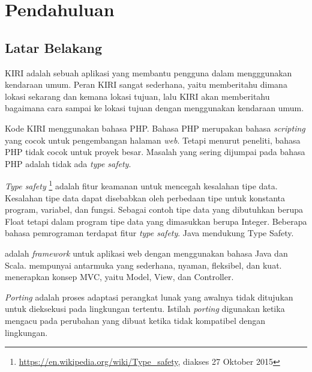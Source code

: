 \chapter{Pendahuluan}
\label{chap:pendahuluan}

\section{Latar Belakang}
\label{sec:latarbelakang}

KIRI \cite{statickiri} adalah sebuah aplikasi yang membantu pengguna dalam mengggunakan kendaraan umum. Peran KIRI sangat sederhana, yaitu memberitahu dimana lokasi sekarang dan kemana lokasi tujuan, lalu KIRI akan memberitahu bagaimana cara sampai ke lokasi tujuan dengan menggunakan kendaraan umum. 

Kode KIRI \cite{githubkiri} menggunakan bahasa PHP. Bahasa PHP \cite{phpnet} merupakan bahasa \textit{scripting} yang cocok untuk pengembangan halaman \textit{web}. Tetapi menurut peneliti, bahasa PHP tidak cocok untuk proyek besar. Masalah yang sering dijumpai pada bahasa PHP adalah tidak ada \textit{type safety}. 

\textit{Type safety} \footnote{ \url{https://en.wikipedia.org/wiki/Type_safety}, diakses 27 Oktober 2015} adalah fitur keamanan untuk mencegah kesalahan tipe data. Kesalahan tipe data dapat disebabkan oleh perbedaan tipe untuk konstanta program, variabel, dan fungsi. Sebagai contoh tipe data yang dibutuhkan berupa Float tetapi dalam program tipe data yang dimasukkan berupa Integer. Beberapa bahasa pemrograman terdapat fitur \textit{type safety}. Java mendukung Type Safety.

\play adalah \textit{framework} untuk aplikasi web dengan menggunakan bahasa Java dan Scala. \play mempunyai antarmuka yang sederhana, nyaman, fleksibel, dan kuat. \play menerapkan konsep MVC, yaitu Model, View, dan Controller\cite{playforjava}. 

\textit{Porting} adalah proses adaptasi perangkat lunak yang awalnya tidak ditujukan untuk dieksekusi pada lingkungan tertentu. Istilah \textit{porting} digunakan ketika mengacu pada perubahan yang dibuat ketika tidak kompatibel dengan lingkungan.

